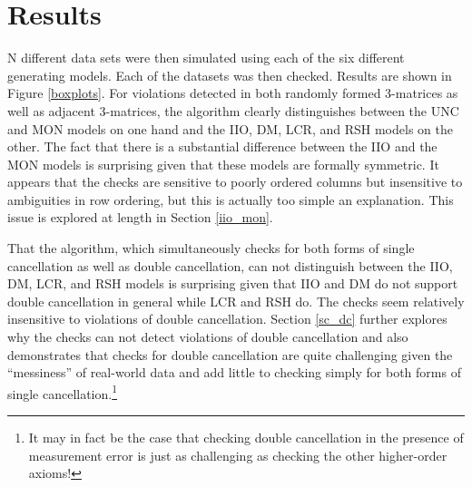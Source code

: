 \documentclass[12pt]{article}
\begin{document}
 
\section{Results}

N different data sets were then simulated using each of the six different generating models. Each of the datasets was then checked. Results are shown in Figure \ref{boxplots}. For violations detected in both randomly formed 3-matrices as well as adjacent 3-matrices, the algorithm clearly distinguishes between the UNC and MON models on one hand and the IIO, DM, LCR, and RSH models on the other. The fact that there is a substantial difference between the IIO and the MON models is surprising given that these models are formally symmetric. It appears that the checks are sensitive to poorly ordered columns but insensitive to ambiguities in row ordering, but this is actually too simple an explanation. This issue is explored at length in Section \ref{iio_mon}.

That the algorithm, which simultaneously checks for both forms of single cancellation as well as double cancellation, can not distinguish between the IIO, DM, LCR, and RSH models is surprising given that IIO and DM do not support double cancellation in general while LCR and RSH do. The checks seem relatively insensitive to violations of double cancellation. Section \ref{sc_dc} further explores why the checks can not detect violations of double cancellation and also demonstrates that checks for double cancellation are quite challenging given the ``messiness'' of real-world data and add little to checking simply for both forms of single cancellation.\footnote{It may in fact be the case that checking double cancellation in the presence of measurement error is just as challenging as checking the other higher-order axioms!} 
\end{document}
